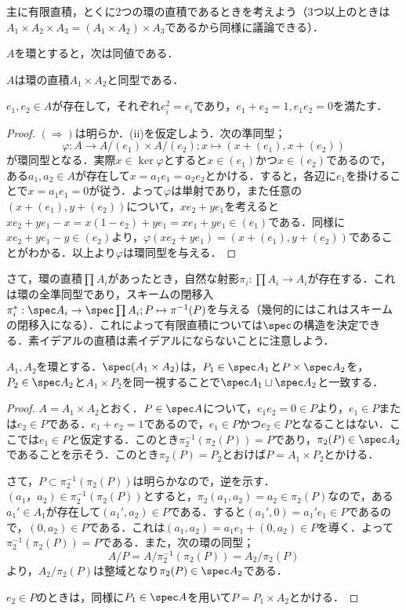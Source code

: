 主に有限直積，とくに2つの環の直積であるときを考えよう（3つ以上のときは$A_1\times A_2\times A_3=(A_1\times A_2)\times A_3$であるから同様に議論できる）．

\begin{prop}
	$A$を環とすると，次は同値である．
	\begin{sakura}
		\item $A$は環の直積$A_1\times A_2$と同型である．
		\item $e_1,e_2\in A$が存在して，それぞれ$e_i^2=e_i$であり，$e_1+e_2=1,e_1e_2=0$を満たす．
	\end{sakura}
\end{prop}

\begin{proof}
	$(\Longrightarrow)$は明らか．(ii)を仮定しよう．次の準同型；
	\[\varphi:A\to A/(e_1)\times A/(e_2);x\mapsto (x+(e_1),x+(e_2))\]
	が環同型となる．実際$x\in\ker\varphi$とすると$x\in (e_1)$かつ$x\in (e_2)$であるので，ある$a_1,a_2\in A$が存在して$x=a_1e_1=a_2e_2$とかける．すると，各辺に$e_1$を掛けることで$x=a_1e_1=0$が従う．よって$\varphi$は単射であり，また任意の$(x+(e_1),y+(e_2))$について，$xe_2+ye_1$を考えると$xe_2+ye_1-x=x(1-e_2)+ye_1=xe_1+ye_1\in (e_1)$である．同様に$xe_2+ye_1-y\in (e_2)$より，$\varphi(xe_2+ye_1)=(x+(e_1),y+(e_2))$であることがわかる．以上より$\varphi$は環同型を与える．
\end{proof}

さて，環の直積$\prod A_i$があったとき，自然な射影$\pi_i:\prod A_i\to A_i$が存在する．これは環の全準同型であり，スキームの閉移入$\pi_i^\ast:\spec A_i\to\spec\prod A_i;P\mapsto \pi^{-1}(P)$を与える（幾何的にはこれはスキームの閉移入になる）．これによって有限直積については$\spec$の構造を決定できる．素イデアルの直積は素イデアルにならないことに注意しよう．
\begin{prop}\label{prop:直積環のspec}
	$A_1,A_2$を環とする．$\spec (A_1\times A_2)$は，$P_1\in\spec A_1$と$P\times \spec A_2$を，$P_2\in\spec A_2$と$A_1\times P_2$を同一視することで$\spec A_1\sqcup\spec A_2$と一致する．
\end{prop}

\begin{proof}
	$A=A_1\times A_2$とおく．$P\in\spec A$について，$e_1e_2=0\in P$より，$e_1\in P$または$e_2\in P$である．$e_1+e_2=1$であるので，$e_1\in P$かつ$e_2\in P$となることはない．ここでは$e_1\in P$と仮定する．このとき$\pi_2^{-1}(\pi_2(P))=P$であり，$\pi_2(P)\in\spec A_2$であることを示そう．このとき$\pi_2(P)=P_2$とおけば$P=A_1\times P_2$とかける．
	
	さて，$P\subset\pi_2^{-1}(\pi_2(P))$は明らかなので，逆を示す．$(a_1，a_2)
	\in\pi_2^{-1}(\pi_2(P))$とすると，$\pi_2(a_1,a_2)=a_2\in\pi_2(P)$なので，ある$a_1'\in A_1$が存在して$(a_1',a_2)\in P$である．すると$(a_1',0)=a_1'e_1\in P$であるので，$(0,a_2)\in P$である．これは$(a_1,a_2)=a_1e_1+(0,a_2)\in P$を導く．よって$\pi_2^{-1}(\pi_2(P))=P$である．また，次の環の同型；
	\[A/P=A/\pi_2^{-1}(\pi_2(P))=A_2/\pi_2(P)\]
	より，$A_2/\pi_2(P)$は整域となり$\pi_2(P)\in\spec A_2$である．
	
	$e_2\in P$のときは，同様に$P_1\in\spec A$を用いて$P=P_1\times A_2$とかける．
\end{proof}

